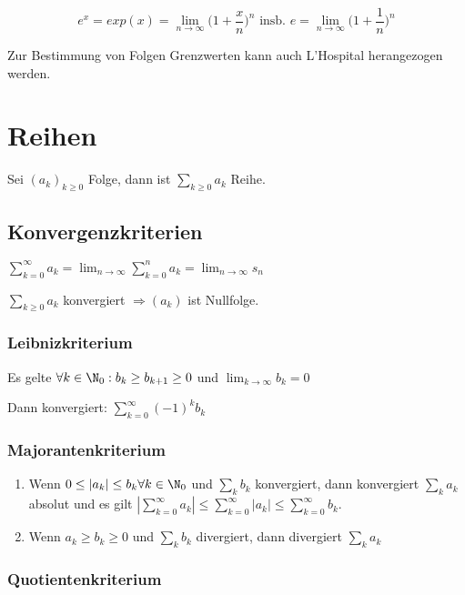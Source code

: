 \[ e^x = exp(x) = \lim_{n\to \infty} \Big(1 + \frac{x}{n}\Big)^n \text{ insb. } e = \lim_{n\to \infty} \Big(1 + \frac{1}{n}\Big)^n \]

Zur Bestimmung von Folgen Grenzwerten kann auch L'Hospital herangezogen werden.

\section*{Reihen}

Sei $(a_k)_{k\geq 0}$ Folge, dann ist $\sum_{k\geq 0} a_k$ Reihe.

\subsection*{Konvergenzkriterien}

$\sum_{k=0}^\infty a_k = \lim_{n\to \infty} \sum_{k=0}^n a_k = \lim_{n\to \infty} s_n$

$\sum_{k\geq 0} a_k$ konvergiert $\Rightarrow (a_k)$ ist Nullfolge.

\subsubsection*{Leibnizkriterium}

Es gelte $\forall k \in \N_0 : b_k \geq b_{k+1} \geq 0$ und $\displaystyle \lim_{k \to \infty} b_k = 0$

Dann konvergiert: $\sum_{k=0}^\infty (-1)^k b_k$

\subsubsection*{Majorantenkriterium}

\begin{enumerate}[label=(\alph*)]
	\item Wenn $0 \leq |a_k| \leq b_k \forall k \in \N_0$ und $\sum_k b_k$ konvergiert, dann konvergiert $\sum_k a_k$ absolut und es gilt $|\sum_{k=0}^\infty a_k| \leq \sum_{k=0}^\infty |a_k| \leq \sum_{k=0}^\infty b_k$.
	\item Wenn $a_k \geq b_k \geq 0$ und $\sum_k b_k$ divergiert, dann divergiert $\sum_k a_k$
\end{enumerate}

\subsubsection*{Quotientenkriterium}

